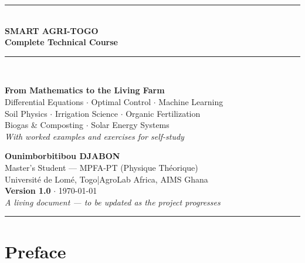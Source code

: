 \documentclass[12pt,a4paper,openany]{book}
\begin{document}
\onehalfspacing

\begin{titlepage}
\vspace*{0.8cm}
\begin{center}
{\color{agrigreen}\rule{\linewidth}{2pt}}\\[0.4cm]
{\fontsize{28}{34}\selectfont\bfseries\color{agrigreen!80!black}
  SMART AGRI-TOGO}\\[0.3cm]
{\LARGE\bfseries Complete Technical Course}\\[0.25cm]
{\color{agrigreen}\rule{\linewidth}{1pt}}\\[0.7cm]
\begin{tcolorbox}[colback=agrigreen!10,colframe=agrigreen!70,
  arc=6pt,width=0.88\textwidth]
\centering
{\large\bfseries From Mathematics to the Living Farm}\\[0.3cm]
{\normalsize
Differential Equations $\cdot$ Optimal Control $\cdot$ Machine Learning\\
Soil Physics $\cdot$ Irrigation Science $\cdot$ Organic Fertilization\\
Biogas \& Composting $\cdot$ Solar Energy Systems\\[0.3cm]
\textit{With worked examples and exercises for self-study}}
\end{tcolorbox}
\vspace{1.2cm}
{\Large\bfseries Ounimborbitibou DJABON}\\[0.3cm]
{\normalsize
Master's Student — MPFA-PT (Physique Théorique)\\
Université de Lomé, Togo\quad|\quad AgroLab Africa, AIMS Ghana}\\[1.2cm]
{\small\color{darkgrey}\textbf{Version 1.0} $\cdot$ \today\\[0.2cm]
\textit{A living document — to be updated as the project progresses}}\\[1.5cm]
{\color{agrigreen}\rule{\linewidth}{1pt}}
\end{center}
\end{titlepage}

\chapter*{Preface}
\end{document}
